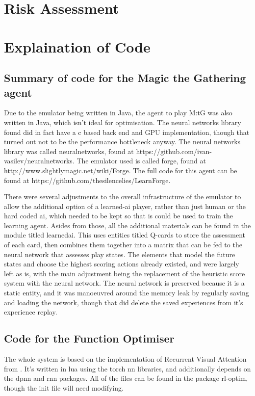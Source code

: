 \appendix
\newpage
\section{Risk Assessment}
\newpage


\section{Explaination of Code}

\subsection{Summary of code for the Magic the Gathering agent}
Due to the emulator being written in Java, the agent to play M:tG was also written in Java, which isn't ideal for optimisation. The neural networks library found did in fact have a c based back end and GPU implementation, though that turned out not to be the performance bottleneck anyway. The neural networks library was called neuralnetworks, found at https://github.com/ivan-vasilev/neuralnetworks. The emulator used is called forge, found at http://www.slightlymagic.net/wiki/Forge. The full code for this agent can be found at https://github.com/thesilencelies/LearnForge. 

There were several adjustments to the overall infrastructure of the emulator to allow the additional option of a learned-ai player, rather than just human or the hard coded ai, which needed to be kept so that is could be used to train the learning agent. Asides from those, all the additional materials can be found in the module titled learnedai. This uses entities titled Q-cards to store the assessment of each card, then combines them together into a matrix that can be fed to the neural network that assesses play states. The elements that model the future states and choose the highest scoring actions already existed, and were largely left as is, with the main adjustment being the replacement of the heuristic score system with the neural network.
The neural network is preserved because it is a static entity, and it was manoeuvred around the memory leak by regularly saving and loading the network, though that did delete the saved experiences from it's experience replay.

\subsection{Code for the Function Optimiser}
The whole system is based on the implementation of Recurrent Visual Attention from \cite{Torch:RVA}. It's written in lua using the torch nn libraries, and additionally depends on the dpnn and rnn packages. All of the files can be found in the package rl-optim, though the init file will need modifying.


